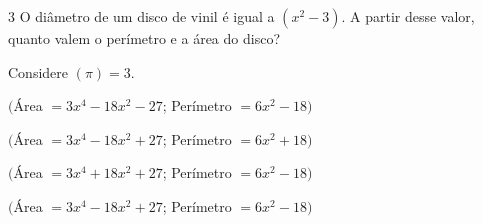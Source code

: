 






\num{3} O diâmetro de um disco de vinil é igual a $(x^2 - 3)$. A partir desse
valor, quanto valem o perímetro e a área do disco?

Considere $(\pi) = 3$.

\begin{escolha}[itemsep=0pt]
\item $($Área $= 3x^4 - 18x^2 - 27$; Perímetro $= 6x^2 - 18)$
\item $($Área $= 3x^4 - 18x^2 + 27$; Perímetro $= 6x^2 + 18)$
\item $($Área $= 3x^4 + 18x^2 + 27$; Perímetro $= 6x^2 - 18)$
\item  $($Área $= 3x^4 - 18x^2 + 27$; Perímetro $= 6x^2 - 18)$ 
\end{escolha}











